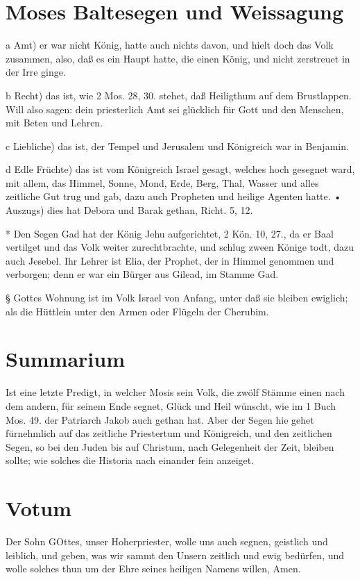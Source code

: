 \section{Moses Baltesegen und Weissagung}

a Amt) er war nicht König, hatte auch nichts davon, und hielt doch das Volk zusammen, also, daß es ein Haupt hatte, die einen König, und nicht zerstreuet in der Irre ginge.

b Recht) das ist, wie 2 Mos. 28, 30. stehet, daß Heiligthum auf dem Brustlappen. Will also sagen: dein priesterlich Amt sei glücklich für Gott und den Menschen, mit Beten und Lehren.

c Liebliche) das ist, der Tempel und Jerusalem und Königreich war in Benjamin.

d Edle Früchte) das ist vom Königreich Israel gesagt, welches hoch gesegnet ward, mit allem, das Himmel, Sonne, Mond, Erde, Berg, Thal, Wasser und alles zeitliche Gut trug und gab, dazu auch Propheten und heilige Agenten hatte.
• Auszugs) dies hat Debora und Barak gethan, Richt. 5, 12.

* Den Segen Gad hat der König Jehu aufgerichtet, 2 Kön. 10, 27., da er Baal vertilget und das Volk weiter zurechtbrachte, und schlug zween Könige todt, dazu auch Jesebel. Ihr Lehrer ist Elia, der Prophet, der in Himmel genommen und verborgen; denn er war ein Bürger aus Gilead, im Stamme Gad.

§ Gottes Wohnung ist im Volk Israel von Anfang, unter daß sie bleiben ewiglich; als die Hüttlein unter den Armen oder Flügeln der Cherubim.

\section{Summarium}

Ist eine letzte Predigt, in welcher Mosis sein Volk, die zwölf Stämme einen nach dem andern, für seinem Ende segnet, Glück und Heil wünscht, wie im 1 Buch Mos. 49. der Patriarch Jakob auch gethan hat. Aber der Segen hie gehet fürnehmlich auf das zeitliche Priestertum und Königreich, und den zeitlichen Segen, so bei den Juden bis auf Christum, nach Gelegenheit der Zeit, bleiben sollte; wie solches die Historia nach einander fein anzeiget.

\section{Votum}

Der Sohn GOttes, unser Hoherpriester, wolle uns auch segnen, geistlich und leiblich, und geben, was wir sammt den Unsern zeitlich und ewig bedürfen, und wolle solches thun um der Ehre seines heiligen Namens willen, Amen.

